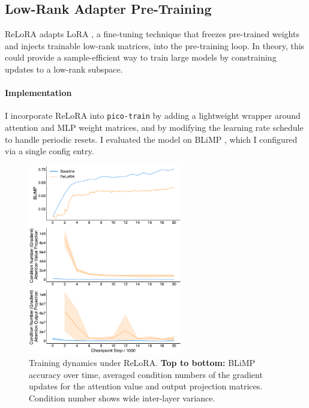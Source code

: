 \subsection{Low-Rank Adapter Pre-Training}
\label{subsec:pico-low-rank-adapter}

ReLoRA \citep{lialin2023relora} adapts LoRA \citep{hu2021lora}, a fine-tuning technique that freezes pre-trained weights and injects trainable low-rank matrices, into the pre-training loop. In theory, this could provide a sample-efficient way to train large models by constraining updates to a low-rank subspace. %

\paragraph{Implementation} I incorporate ReLoRA into \texttt{pico-train} by adding a lightweight wrapper around attention and MLP weight matrices, and by modifying the learning rate schedule to handle periodic resets. I evaluated the model on BLiMP \citep{warstadt2020blimp}, which I configured via a single config entry. %

\begin{figure}[h!]
    \centering
    \includegraphics[width=0.6\textwidth]{chapters/pico/figures/relora-example.pdf}
    \caption{Training dynamics under ReLoRA.
    \textbf{Top to bottom:} BLiMP accuracy over time, averaged condition numbers of the gradient updates for the attention value and output projection matrices. Condition number shows wide inter-layer variance.
    }
    \label{fig:relora_example}
\end{figure}

